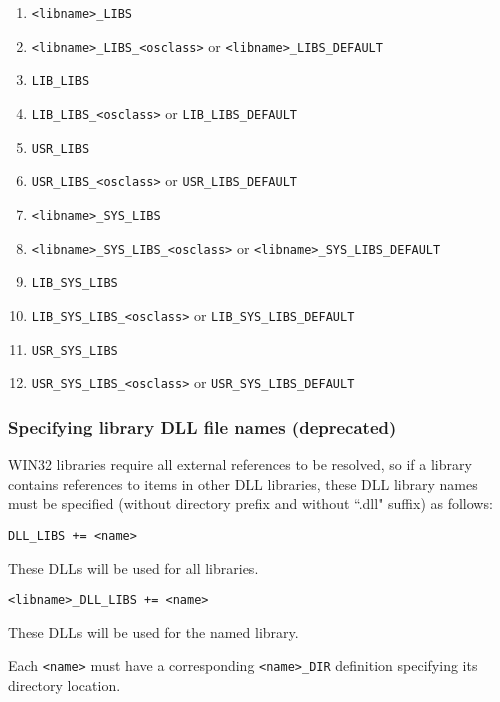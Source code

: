 \begin{enumerate}
\item {}\verb|<libname>_LIBS|

\item \verb|<libname>_LIBS_<osclass>| or \verb|<libname>_LIBS_DEFAULT|

\item {}\verb|LIB_LIBS|

\item \verb|LIB_LIBS_<osclass>| or \verb|LIB_LIBS_DEFAULT|

\item {}\verb|USR_LIBS|

\item \verb|USR_LIBS_<osclass>| or \verb|USR_LIBS_DEFAULT|

\item {}\verb|<libname>_SYS_LIBS|

\item \verb|<libname>_SYS_LIBS_<osclass>| or \verb|<libname>_SYS_LIBS_DEFAULT|

\item {}\verb|LIB_SYS_LIBS|

\item \verb|LIB_SYS_LIBS_<osclass>| or \verb|LIB_SYS_LIBS_DEFAULT|

\item {}\verb|USR_SYS_LIBS|

\item \verb|USR_SYS_LIBS_<osclass>| or \verb|USR_SYS_LIBS_DEFAULT|
\end{enumerate}

\subsubsection{Specifying library DLL file names (deprecated)}

WIN32 libraries require all external references to be resolved, so if a library contains references to items in other DLL 
libraries, these DLL library names must be specified (without directory prefix and without ``.dll" suffix) as follows:

\begin{description}

\item {}\verb|DLL_LIBS += <name>|

These DLLs will be used for all libraries.

\item {}\verb|<libname>_DLL_LIBS += <name>|

These DLLs will be used for the named library.

Each \verb|<name>| must have a corresponding \verb|<name>_DIR| definition specifying its directory location.

\end{description}

